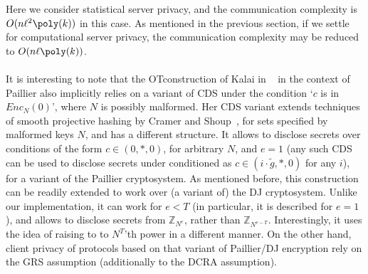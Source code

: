 \documentclass{article}
\newcommand{\Z}{{\mathbb{Z}}}
\newcommand{\ot}{\mbox{OT}\;}
\begin{document}
Here we consider statistical server privacy, and the communication complexity
is $O(n\ell^2\poly(k))$ in this case. As mentioned in the previous section, if we settle for computational server privacy, the communication complexity may be reduced to $O(n\ell \poly(k))$.

\paragraph{} It is interesting to note that the \ot construction of Kalai in ~\cite{T05} in the context
of Paillier also implicitly relies on a variant of CDS under the condition `$c$ is in $Enc_N(0)$', where $N$ is possibly malformed.
Her CDS variant extends techniques of smooth projective hashing by Cramer and Shoup~\cite{addref},
for sets specified by malformed keys $N$, and has a different structure.
It allows to disclose secrets over conditions of the form $c\in(0,*,0)$, for arbitrary $N$, and $e=1$
(any such CDS can be used to disclose secrets under conditioned as $c\in(i\cdot \tilde{g},*,0)$ for any $i$), for a variant of the Paillier cryptosystem. As mentioned before, this construction can be
readily extended to work over (a variant of) the DJ cryptosystem. Unlike our implementation, it can work
for $e<T$ (in particular, it is described for $e=1$), and allows to disclose secrets from $\Z_{N^e}$,
rather than $\Z_{N^{e-T}}$. Interestingly, it uses the idea of raising to to $N^T$'th power in a different manner. On the other hand, client privacy of protocols based on that variant of Paillier/DJ encryption
rely on the GRS assumption (additionally to the DCRA assumption).
  
\end{document}
